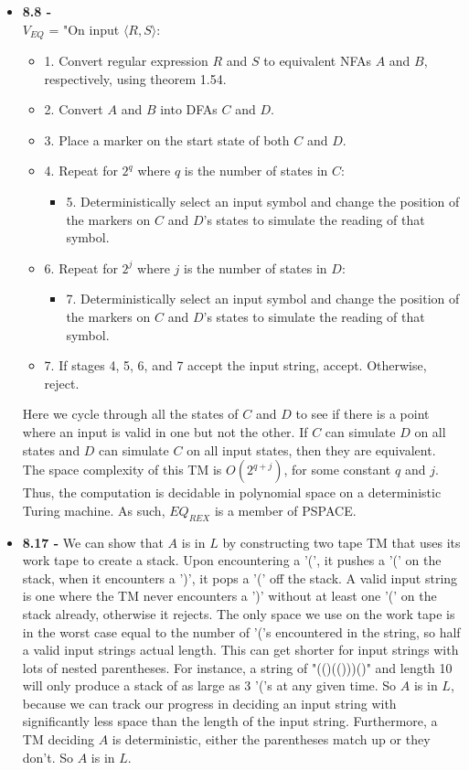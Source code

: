 \documentclass{article}
\begin{document}
\begin{itemize}
  \item \textbf{8.8 - } \\
    $V_{EQ}$ = "On input $\langle R, S \rangle$:
    \begin{itemize}
      \item 1. Convert regular expression $R$ and $S$ to equivalent NFAs $A$ and $B$, respectively, using theorem 1.54.
      \item 2. Convert $A$ and $B$ into DFAs $C$ and $D$.
      \item 3. Place a marker on the start state of both $C$ and $D$.
      \item 4. Repeat for $2^{q}$ where $q$ is the number of states in $C$:
        \begin{itemize}
          \item 5. Deterministically select an input symbol and change the position of the markers on $C$ and $D$'s states to simulate the reading of that symbol.
        \end{itemize}
      \item 6. Repeat for $2^{j}$ where $j$ is the number of states in $D$:
        \begin{itemize}
          \item 7. Deterministically select an input symbol and change the position of the markers on $C$ and $D$'s states to simulate the reading of that symbol.
        \end{itemize}
      \item 7. If stages 4, 5, 6, and 7 accept the input string, accept. Otherwise, reject.
    \end{itemize}
    Here we cycle through all the states of $C$ and $D$ to see if there is a point where an input is valid in one but not the other. If $C$ can simulate $D$ on all states and $D$ can simulate $C$ on all input states, then they are equivalent. The space complexity of this TM is $O(2^{q+j})$, for some constant $q$ and $j$. Thus, the computation is decidable in polynomial space on a deterministic Turing machine. As such, $EQ_{REX}$ is a member of PSPACE.
  \item \textbf{8.17 - } We can show that $A$ is in $L$ by constructing two tape TM that uses its work tape to create a stack. Upon encountering a '(', it pushes a '(' on the stack, when it encounters a ')', it pops a '(' off the stack. A valid input string is one where the TM never encounters a ')' without at least one '(' on the stack already, otherwise it rejects. The only space we use on the work tape is in the worst case equal to the number of '('s encountered in the string, so half a valid input strings actual length. This can get shorter for input strings with lots of nested parentheses. For instance, a string of "(()(()))()" and length 10 will only produce a stack of as large as 3 '('s at any given time. So $A$ is in $L$, because we can track our progress in deciding an input string with significantly less space than the length of the input string. Furthermore, a TM deciding $A$ is deterministic, either the parentheses match up or they don't. So $A$ is in $L$. 
\end{itemize}
\end{document}
